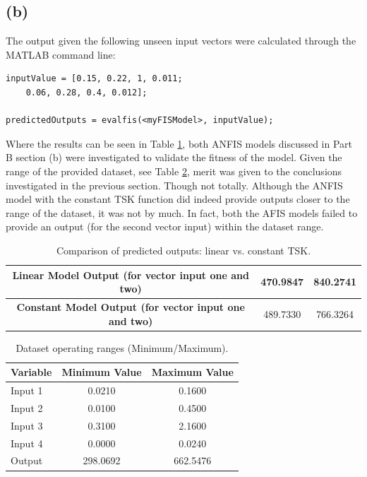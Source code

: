 \documentclass[12pt]{article}
\begin{document}
\subsection{(b)}

The output given the following unseen input vectors were calculated through the MATLAB command line:

\begin{verbatim}
inputValue = [0.15, 0.22, 1, 0.011;
    0.06, 0.28, 0.4, 0.012];

predictedOutputs = evalfis(<myFISModel>, inputValue);
\end{verbatim}

Where the results can be seen in Table \ref{tab:predictionBb}, both ANFIS models discussed in Part B section (b) were investigated to validate the fitness of the model.
Given the range of the provided dataset, see Table \ref{tab:datasetRanges}, merit was given to the conclusions investigated in the previous section.
Though not totally.
Although the ANFIS model with the constant TSK function did indeed provide outputs closer to the range of the dataset, it was not by much.
In fact, both the AFIS models failed to provide an output (for the second vector input) within the dataset range.
\\

\begin{table}[H]
\centering
\begin{tabular}{|c|c|c|}
\hline
\textbf{Linear Model Output (for vector input one and two)} &  470.9847 &  840.2741 \\ \hline
\textbf{Constant Model Output (for vector input one and two)} & 489.7330 & 766.3264\\ \hline
\end{tabular}
\label{tab:predictionBb}
\caption{Comparison of predicted outputs: linear vs. constant TSK.}
\end{table}

\begin{table}[H]
\centering
\begin{tabular}{|l|c|c|}    
\hline
\textbf{Variable} & \textbf{Minimum Value} & \textbf{Maximum Value} \\ \hline
Input 1 & 0.0210 & 0.1600 \\ \hline
Input 2 & 0.0100 & 0.4500 \\ \hline
Input 3 & 0.3100 & 2.1600 \\ \hline
Input 4 & 0.0000 & 0.0240 \\ \hline
Output & 298.0692 & 662.5476 \\ \hline
\end{tabular}
\label{tab:datasetRanges}
\caption{Dataset operating ranges (Minimum/Maximum).}
\end{table}
\end{document}
